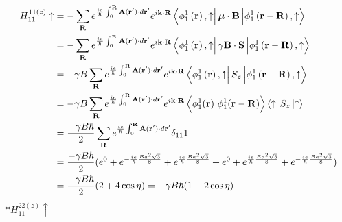 \documentclass{report}
\newcommand{\f}[2]{\dfrac{#1}{#2}}
\begin{document}
\begin{align*}
	H_{11}^{11(z)} \uparrow & = - \sum_{\mathbf{R}} e^{\frac{ie}{\hbar}\int_0^{\mathbf{R}}\mathbf{A}(\mathbf{r'})\cdot d\mathbf{r'}}e^{i\mathbf{k\cdot R}} \bra{\phi^{1}_{1} \left(\mathbf{r}\right), \uparrow} \boldsymbol{\mu}\cdot \mathbf{B} \ket{\phi^{1}_{1} \left(\mathbf{r - R}\right) ,\uparrow} \\
	                        & = - \sum_{\mathbf{R}} e^{\frac{ie}{\hbar}\int_0^{\mathbf{R}}\mathbf{A}(\mathbf{r'})\cdot d\mathbf{r'}}e^{i\mathbf{k\cdot R}} \bra{\phi^{1}_{1} \left(\mathbf{r}\right) ,\uparrow} \gamma \mathbf{B}\cdot\mathbf{S} \ket{\phi^{1}_{1} \left(\mathbf{r - R}\right) ,\uparrow} \\
	                        & = -\gamma B \sum_{\mathbf{R}} e^{\frac{ie}{\hbar}\int_0^{\mathbf{R}}\mathbf{A}(\mathbf{r'})\cdot d\mathbf{r'}}e^{i\mathbf{k\cdot R}} \bra{\phi^{1}_{1} \left(\mathbf{r}\right) ,\uparrow} S_z \ket{\phi^{1}_{1} \left(\mathbf{r-R}\right) ,\uparrow}                        \\
	                        & = -\gamma B \sum_{\mathbf{R}} e^{\frac{ie}{\hbar}\int_0^{\mathbf{R}}\mathbf{A}(\mathbf{r'})\cdot d\mathbf{r'}}e^{i\mathbf{k\cdot R}} \bra{\phi_{1}^{1}(\mathbf{r})} \ket{\phi_{1}^{1}(\mathbf{r-R}) }\bra{\uparrow}S_z\ket{\uparrow}                                        \\
	                        & = \f{ -\gamma B\hbar}{2} \sum_{\mathbf{R}} e^{\frac{ie}{\hbar}\int_0^{\mathbf{R}}\mathbf{A}(\mathbf{r'})\cdot d\mathbf{r'}} \delta_{11} 1                                                                                                                                   \\
	                        & = \f{ -\gamma B\hbar}{2} (e^{0} + e^{-\frac{ie}{\hbar}\frac{Ba^2\sqrt{3}}{8}} + e^{\frac{ie}{\hbar}\frac{Ba^2\sqrt{3}}{8}} + e^{0} +
	e^{\frac{ie}{\hbar}\frac{Ba^2\sqrt{3}}{8}}
	+ e^{-\frac{ie}{\hbar}\frac{Ba^2\sqrt{3}}{8}} )                                                                                                                                                                                                                                                       \\
	                        & = \f{-\gamma B\hbar}{2} (2 + 4\cos\eta)  = -\gamma B\hbar(1+2\cos\eta)
\end{align*}
$\ast 	H_{11}^{22(z)} \uparrow$
\end{document}
